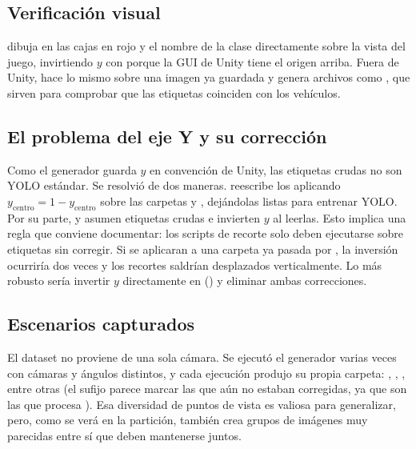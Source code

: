 \documentclass[11pt,a4paper]{article}
\begin{document}
\subsection{Verificación visual}

 dibuja en  las cajas en rojo y el nombre de la clase directamente sobre la vista del juego, invirtiendo $y$ con  porque la GUI de Unity tiene el origen arriba. Fuera de Unity,  hace lo mismo sobre una imagen ya guardada y genera archivos como , que sirven para comprobar que las etiquetas coinciden con los vehículos.

\subsection{El problema del eje Y y su corrección}

Como el generador guarda $y$ en convención de Unity, las etiquetas crudas no son YOLO estándar. Se resolvió de dos maneras.  reescribe los  aplicando $y_{\text{centro}} = 1 - y_{\text{centro}}$ sobre las carpetas  y , dejándolas listas para entrenar YOLO. Por su parte,  y  asumen etiquetas crudas e invierten $y$ al leerlas. Esto implica una regla que conviene documentar: los scripts de recorte solo deben ejecutarse sobre etiquetas sin corregir. Si se aplicaran a una carpeta ya pasada por , la inversión ocurriría dos veces y los recortes saldrían desplazados verticalmente. Lo más robusto sería invertir $y$ directamente en  () y eliminar ambas correcciones.

\subsection{Escenarios capturados}

El dataset no proviene de una sola cámara. Se ejecutó el generador varias veces con cámaras y ángulos distintos, y cada ejecución produjo su propia carpeta: , , , entre otras (el sufijo  parece marcar las que aún no estaban corregidas, ya que son las que procesa ). Esa diversidad de puntos de vista es valiosa para generalizar, pero, como se verá en la partición, también crea grupos de imágenes muy parecidas entre sí que deben mantenerse juntos.
\end{document}
